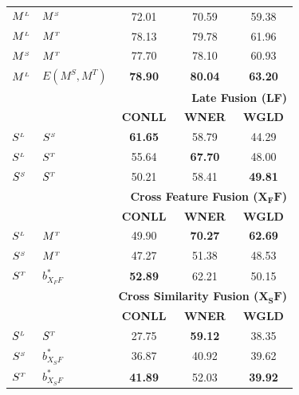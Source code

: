 \begin{table}[!t]
\begin{tabular}{@{}llccc@{}}
$M^{\scriptscriptstyle L}$ & $M^{\scriptscriptstyle S}$ & 72.01                      & 70.59                     & 59.38                     \\
$M^{\scriptscriptstyle L}$ & $M^{\scriptscriptstyle T}$ & 78.13                      & 79.78                     & 61.96                     \\
$M^{\scriptscriptstyle S}$ & $M^{\scriptscriptstyle T}$ & 77.70                      & 78.10                     & 60.93                     \\
$M^{\scriptscriptstyle L}$ & $E(M^S, M^T)$ & \textbf{78.90}                      & \textbf{80.04}                     & \textbf{63.20}                   \\
\midrule
          &           & \multicolumn{3}{r}{\textbf{Late Fusion (LF)} }                                             \\
\midrule     
          &           & \textbf{CONLL}                      & \textbf{WNER}                      & \textbf{WGLD}                      \\ \cmidrule{3-5}
$S^{\scriptscriptstyle L}$ & $S^{\scriptscriptstyle S}$ & \textbf{61.65}                      & 58.79                     & 44.29                     \\
$S^{\scriptscriptstyle L}$ & $S^{\scriptscriptstyle T}$ & 55.64                      & \textbf{67.70}                     & 48.00                     \\
$S^{\scriptscriptstyle S}$ & $S^{\scriptscriptstyle T}$ & 50.21                      & 58.41                     & \textbf{49.81}                     \\
\midrule
          &           & \multicolumn{3}{r}{\textbf{Cross Feature Fusion ($\mathbf{X_FF}$)}} \\
\midrule
          &           & \textbf{CONLL}                      & \textbf{WNER}                      & \textbf{WGLD}                      \\ \cmidrule{3-5}
$S^{\scriptscriptstyle L}$ &$M^{\scriptscriptstyle T}$        & 49.90                      & \textbf{70.27}                     & \textbf{62.69}                    \\
$S^{\scriptscriptstyle S}$ & $M^{\scriptscriptstyle T}$ & 47.27                      & 51.38                     & 48.53                     \\
$S^{\scriptscriptstyle T}$ & ${b}^*_{\scriptscriptstyle X_FF}$        & \textbf{52.89}                      & 62.21                     & 50.15                     \\
\midrule
          &           & \multicolumn{3}{r}{\textbf{Cross Similarity Fusion ($\mathbf{X_SF}$)}}  \\
\midrule
          &           & \textbf{CONLL}                      & \textbf{WNER}                      & \textbf{WGLD}                      \\ \cmidrule{3-5}
$S^{\scriptscriptstyle L}$ & $S^{\scriptscriptstyle T}$ & 27.75                      & \textbf{59.12}                     & 38.35                     \\
$S^{\scriptscriptstyle S}$ & ${b}_{\scriptscriptstyle X_SF}^{*}$       & 36.87                      & 40.92                     & 39.62                     \\
$S^{\scriptscriptstyle T}$ & ${b}_{\scriptscriptstyle X_SF}^{*}$        & \textbf{41.89}                      & 52.03                     & \textbf{39.92}                     \\ \bottomrule
\end{tabular}
\end{table}

